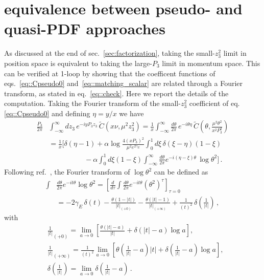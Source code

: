 \section{equivalence between pseudo- and quasi-PDF approaches}
\label{app:check}

As discussed at the end of sec.~\ref{sec:factorization}, taking the
small-$z_3^2$ limit in position space is equivalent to taking the large-$P_3$
limit in momentum space. This can be verified at 1-loop by showing that the
coefficent functions of eqs.~\eqref{eq::Cpseudo0} and~\eqref{eq::matching_scalar} are
related through a Fourier transform, as stated in eq.~\eqref{eq::check}. Here we
report the details of the computation. Taking the Fourier transform of the
small-$z_3^2$ coefficient of eq.\eqref{eq::Cpseudo0} and defining $\eta= y/x$ we
have 
\begin{align}
    \label{eq::checkapp}
	\frac{P_3}{2\pi}&\int_{-\infty}^{\infty} dz_3\, e^{-i y P_3 z_3 }\,
	\tilde{C}\left(x\nu, \mu^2 z_3^2 \right) = 
    \frac{1}{x}\int_{-\infty}^{\infty}\frac{d\theta}{2\pi}\, e^{-i\theta\eta}\,
	\tilde{C}\left(\theta, \frac{\mu^2\theta^2}{x^2 P_3^2} \right) \nonumber \\
    & = \frac{1}{x}\biggl[\delta\left(\eta-1\right) 
    +\alpha\log\frac{4 \left(xP_3\right)^2}{\mu^2 e^{2\gamma_E}}\int_0^1 d\xi\,
    \delta\left(\xi-\eta\right)\left(1-\xi\right) \nonumber \\
    &\,\,\,\,\,\,\,\,\,\,\,\,\,\,\,\,\,\,\,\,\,\,\,\,\,\,\,\,\,\,
    -\alpha\int_0^1 d\xi \left(1-\xi\right)\int_{-\infty}^{\infty} \frac{d\theta}{2\pi} 
    e^{-i \left(\eta-\xi\right) \theta} \,\log\theta^2\biggr]\, .
\end{align}
Following ref.~\cite{Izubuchi:2018srq}, the Fourier transform of $\log\theta^2$
can be defined as
\begin{align}
    \label{eq::FTlog}
    \int& \frac{d\theta}{2\pi} e^{-i t \theta} \log \theta^2
    = \left[\frac{d}{d\tau} \int \frac{d\theta}{2\pi} e^{-it \theta} 
    \left(\theta^2\right)^{\tau}\right]_{\tau=0} \nonumber\\
    &= -2 \gamma_E \, \delta\left(t\right) - \frac{\theta\left(1 - |t|\right)}{|t|_{\left(+0\right)}}
    - \frac{\theta\left(|t| -1\right)}{|t|_{\left(+\infty\right)}}
    + \frac{1}{\left(t\right)^2}\,\delta\left(\frac{1}{|t|}\right)\, ,
\end{align}
with
\begin{align}
    \label{eq::distribution1}
    &\frac{1}{|t|}_{\left(+0\right)} 
    = \lim_{a\rightarrow 0}
    \left[\frac{\theta\left(|t|-a\right)}{|t|} +  \delta\left(|t|-a\right)\log a\right], \\
    &\frac{1}{|t|}_{\left(+\infty\right)} 
    = \frac{1}{\left(t\right)^2}\lim_{a\rightarrow 0}
    \left[\theta\left(\frac{1}{|t|}-a\right)|t| + \delta\left(\frac{1}{|t|}-a\right)\log a\right], \\
    &\delta\left(\frac{1}{|t|}\right) = \lim_{a\rightarrow 0}\delta\left(\frac{1}{|t|} - a\right)\, .
\end{align}
